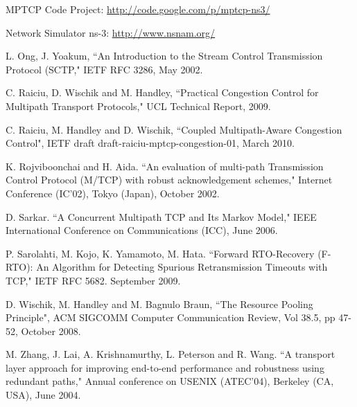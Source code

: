 \documentclass{sig-alternate}
\begin{document}
\begin{thebibliography}{1}
MPTCP Code Project: \url{http://code.google.com/p/mptcp-ns3/}

Network Simulator ns-3: \url{http://www.nsnam.org/}

L. Ong, J. Yoakum, ``An Introduction to the Stream Control Transmission Protocol (SCTP," IETF RFC 3286, May 2002.

C. Raiciu, D. Wischik and M. Handley, ``Practical Congestion Control for Multipath Transport Protocols," UCL Technical Report, 2009.

C. Raiciu, M. Handley and D. Wischik, ``Coupled Multipath-Aware Congestion Control", IETF draft draft-raiciu-mptcp-congestion-01, March 2010.

K. Rojviboonchai and H. Aida. ``An evaluation of multi-path Transmission Control Protocol (M/TCP) with robust acknowledgement schemes," Internet Conference (IC'02), Tokyo (Japan), October 2002.

D. Sarkar. ``A Concurrent Multipath TCP and Its Markov Model," IEEE International Conference on Communications (ICC), June 2006.

P. Sarolahti, M. Kojo, K. Yamamoto, M. Hata. ``Forward RTO-Recovery (F-RTO): An Algorithm for Detecting Spurious Retransmission Timeouts with TCP," IETF RFC 5682. September 2009.

D. Wischik, M. Handley and  M. Bagnulo Braun, ``The Resource Pooling Principle", ACM SIGCOMM Computer Communication Review, Vol 38.5, pp 47-52, October 2008.

M. Zhang, J. Lai, A. Krishnamurthy, L. Peterson and R. Wang. ``A transport layer approach for improving end-to-end performance and robustness using redundant paths," Annual conference on USENIX (ATEC'04), Berkeley (CA, USA), June 2004.

\end{thebibliography}
\end{document}
